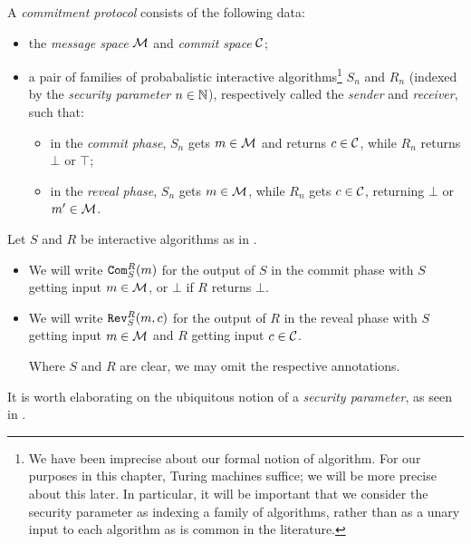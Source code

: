 \begin{dfn}\label{def:commitment protocol}
	A \emph{commitment protocol} consists of the following data:
	\begin{itemize}
		\item the \emph{message space} $\mathcal{M}$ and \emph{commit space} $\mathcal{C}$;
		\item a pair of families of probabalistic interactive algorithms\footnote{We
			      have been imprecise about our formal notion of algorithm. For our
			      purposes in this chapter, Turing machines suffice; we will be more
			      precise about this later. In particular, it will be important that we
			      consider the security parameter as indexing a family of algorithms, rather
			      than as a unary input to each algorithm as is common in the literature.}
		      $S_n$ and $R_n$ (indexed by the
		      \emph{security parameter} $n\in\mathbb{N}$), respectively called the \emph{sender}
		      and \emph{receiver}, such that:
		      \begin{itemize}
			      \item in the \emph{commit phase}, $S_n$ gets $m\in\mathcal{M}$ and returns
			            $c\in\mathcal{C}$, while $R_n$ returns $\bot$ or $\top$;
			      \item in the \emph{reveal phase}, $S_n$ gets $m\in\mathcal{M}$, while $R_n$
			            gets $c\in\mathcal{C}$, returning $\bot$ or $m'\in\mathcal{M}$.
		      \end{itemize}
	\end{itemize}
\end{dfn}

\begin{ntn}
	Let $S$ and $R$ be interactive algorithms as in .\begin{itemize}
		\item	We will write ${\texttt{Com}}_S^R(m)$ for the output of $S$
		      in the commit phase with $S$ getting input $m\in\mathcal{M}$, or $\bot$ if $R$
		      returns $\bot$.
		\item We will write ${\texttt{Rev}}_S^R(m, c)$
		      for the output of $R$ in the reveal phase with $S$ getting input
		      $m\in\mathcal{M}$ and $R$ getting input $c\in\mathcal{C}$.

		      Where $S$ and $R$ are clear, we may omit the respective annotations.
	\end{itemize}
\end{ntn}

\noindent
It is worth elaborating on the ubiquitous notion of a \emph{security parameter}, as
seen in .

